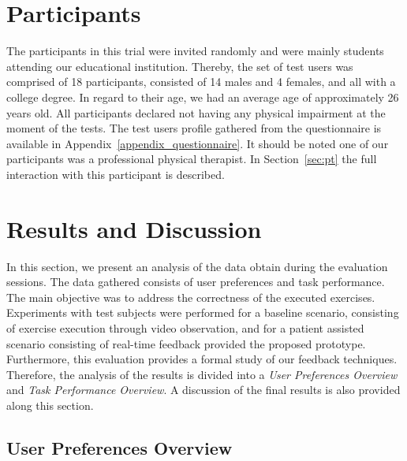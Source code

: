 \section{Participants} 


The participants in this trial were invited randomly and were mainly students attending our educational
institution. Thereby, the set of test users was comprised of 18 participants, consisted of 14 males and 4 females,
and all with a college degree. In regard to their age, we had an average age of approximately 26 years old. 
All participants declared not having any physical impairment at the moment of the tests. 
The test users profile gathered from the questionnaire is available in Appendix~\ref{appendix_questionnaire}.
It should be noted one of our participants was a professional physical therapist. 
In Section~\ref{sec:pt} the full interaction with this participant is described.


\section{Results and Discussion}
\label{sec:results}

In this section, we present an analysis of the data obtain during the evaluation sessions.
The data gathered consists of user preferences and task performance.
The main objective was to address the correctness of the executed exercises. 
Experiments with test subjects were performed for a baseline scenario, consisting of exercise execution through video observation, and for a patient assisted scenario consisting of real-time feedback provided the proposed prototype. 
Furthermore, this evaluation provides a formal study of our feedback techniques.
Therefore, the analysis of the results is divided into a {\it User Preferences Overview} and {\it Task Performance Overview}. 
A discussion of the final results is also provided along this section.

\subsection{User Preferences Overview}

